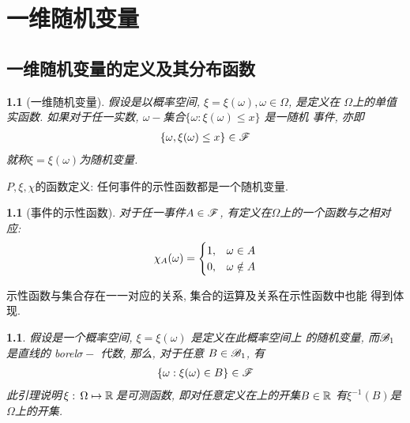 \chapter{一维随机变量}

\section{一维随机变量的定义及其分布函数} %

\newtheorem{one_dimensional_random_variable}[theorem_root]{}
\begin{one_dimensional_random_variable}[一维随机变量]
假设\prbsp 是以概率空间, \(\xi = \xi(\omega), \omega\in\Omega\), 是定义在
\(\Omega\)上的单值实函数. 如果对于任一实数, \(\omega-\)集合\(\{\omega: \xi(\omega)\le x\}\) 是一随机
事件, 亦即
\begin{align}
    \{\omega, \xi(\omega) \le x\}\in\msF
\end{align}
就称\(\xi = \xi(\omega)\)为随机变量.
\end{one_dimensional_random_variable}

\medskip
\noindent\(P, \xi, \chi\)的函数定义:
任何事件的示性函数都是一个随机变量.

\newtheorem{indictive_function}[theorem_root]{}
\begin{indictive_function}[事件的示性函数]
对于任一事件\(A\in\msF\), 有定义在\(\Omega\)上的一个函数与之相对应:
\begin{align}
    \chi_A(\omega) = \begin{cases}
        1, & \omega\in A\cr
        0, & \omega\notin A\cr
    \end{cases}
\end{align}
\end{indictive_function}

示性函数与集合存在一一对应的关系, 集合的运算及关系在示性函数中也能
得到体现.

\newtheorem{about_probability_variable_and_the_event}[theorem_root]{\lemma}
\begin{about_probability_variable_and_the_event}
    假设\prbsp 是一个概率空间, \(\xi = \xi(\omega)\) 是定义在此概率空间上
    的随机变量, 而\(\msB_1\)是直线的 borel\(\sigma-\) 代数, 那么, 对于任意
    \(B\in \msB_1\), 有
    \begin{align}
    \{\omega: \xi(\omega)\in B\}\in\msF
    \end{align}
此引理说明\(\,\xi:\,\Omega\mapsto \Rs\,\)是可测函数, 即对任意定义在\Rs 上的开集\(B\in\Rs\)
有\(\xi^{-1}(B)\)是\(\Omega\)上的开集.
\end{about_probability_variable_and_the_event}

